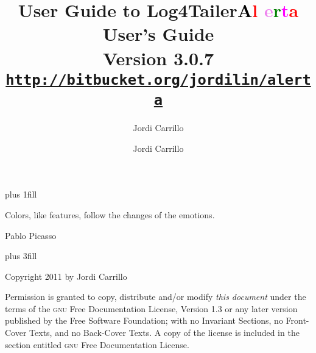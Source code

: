 \documentclass[a4paper, twoside]{article}
\author{Jordi Carrillo}
\title{User Guide to Log4Tailer}
\newcommand{\logftailer}{\textbf{\textcolor{black}{A}\textcolor{red}{l}%
\textcolor{Violet}{e}\textcolor{green}{r}\textcolor{magenta}{t}\textcolor{red}{a}}}
\newcommand{\contentsrule}[1]{{\color{blue}\sectionrule{3ex}{3pt}{-2ex}{1pt}{#1}}}
\begin{document}


\newpage
\pagecolor{white}

\vbox{}
\vskip0pt plus 1fill
\epigraph{Colors, like features, follow the changes of the emotions.}{Pablo Picasso}
 \vskip0pt plus 3fill

\noindent
Copyright 2011 by Jordi Carrillo

\medskip
\noindent 
Permission is granted to copy, distribute and/or modify \emph{this document}
under the terms of the \textsc{gnu} Free Documentation License, Version 1.3
or any later version published by the Free Software Foundation;
with no Invariant Sections, no Front-Cover Texts, and no Back-Cover Texts.
A copy of the license is included in the section entitled \textsc{gnu}
Free Documentation License.


\vbox{}
\newpage


\title{{\bfseries \logftailer{} User's Guide}\\[1mm]
  \large Version 3.0.7\\[1mm]
\large\href{http://bitbucket.org/jordilin/alerta}{\texttt{http://bitbucket.org/jordilin/alerta}}}
\author{Jordi Carrillo}

\maketitle

\tableofcontents

\newpage




%

\end{document}

